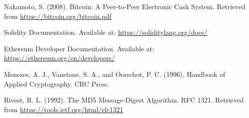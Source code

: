 \documentclass[11pt]{article}
\begin{document}
\clearpage

\begin{thebibliography}{9}

     Nakamoto, S. (2008). Bitcoin: A Peer-to-Peer Electronic Cash System. Retrieved from \url{https://bitcoin.org/bitcoin.pdf}

     Solidity Documentation. Available at: \url{https://soliditylang.org/docs/}

     Ethereum Developer Documentation. Available at: \url{https://ethereum.org/en/developers/}

     Menezes, A. J., Vanstone, S. A., and Oorschot, P. C. (1996). Handbook of Applied Cryptography. CRC Press.

     Rivest, R. L. (1992). The MD5 Message-Digest Algorithm. RFC 1321. Retrieved from \url{https://tools.ietf.org/html/rfc1321}

\end{thebibliography}
\end{document}
